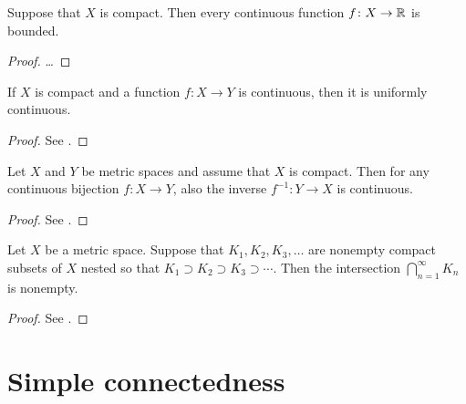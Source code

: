 \begin{theorem}
  \label{thm:continuous_on_compact_implies_bounded}
  Suppose that $X$ is compact.
  Then every continuous function $f \colon X \to \mathbb{R}$
  is bounded.
\end{theorem}
\begin{proof}
  \ldots
\end{proof}

\begin{lemma}
  \label{lem:on_compact_continuous_implies_uniformly_continuous}
  If $X$ is compact and a function $f \colon X \to Y$ is continuous, then it is uniformly continuous.
\end{lemma}
\begin{proof}
  See \MetSpCourse{}.
\end{proof}

\begin{lemma}
  \label{lem:continuous_bijection_homeomorphism}
  Let $X$ and $Y$ be metric spaces and assume that $X$ is compact.
  Then for any continuous bijection $f \colon X \to Y$,
  also the inverse $f^{-1} \colon Y \to X$ is continuous.
\end{lemma}
\begin{proof}
  See \MetSpCourse{}.
\end{proof}

\begin{theorem}
  \label{thm:intersect_nested_compacts}
  Let $X$ be a metric space.
  Suppose that $K_1, K_2, K_3, \ldots$ are nonempty compact
  subsets of $X$ nested so that $K_1 \supset K_2 \supset K_3 \supset \cdots$.
  Then the intersection $\bigcap_{n=1}^\infty K_n$ is nonempty.
\end{theorem}
\begin{proof}
  See \MetSpCourse{}.
\end{proof}



\section{Simple connectedness}

